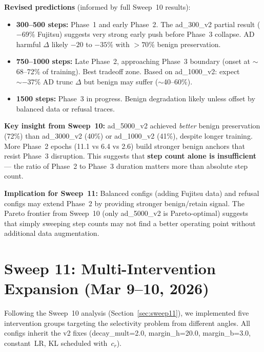 \documentclass[11pt]{article}
\begin{document}
\textbf{Revised predictions} (informed by full Sweep~10 results):
\begin{itemize}
  \item \textbf{300--500 steps:} Phase~1 and early Phase~2.
        The ad\_300\_v2 partial result ($-69\%$ Fujitsu) suggests very strong early
        push before Phase~3 collapse. AD harmful $\Delta$ likely $-20$ to $-35\%$
        with $>70\%$ benign preservation.
  \item \textbf{750--1000 steps:} Late Phase~2, approaching Phase~3 boundary
        (onset at $\sim$68--72\% of training). Best tradeoff zone.
        Based on ad\_1000\_v2: expect $\sim -37\%$ AD trunc $\Delta$ but benign
        may suffer ($\sim$40--60\%).
  \item \textbf{1500 steps:} Phase~3 in progress. Benign degradation likely
        unless offset by balanced data or refusal traces.
\end{itemize}

\textbf{Key insight from Sweep~10:} ad\_5000\_v2 achieved \emph{better} benign
preservation (72\%) than ad\_3000\_v2 (40\%) or ad\_1000\_v2 (41\%), despite
longer training. More Phase~2 epochs (11.1 vs 6.4 vs 2.6) build stronger
benign anchors that resist Phase~3 disruption. This suggests that
\textbf{step count alone is insufficient} --- the ratio of Phase~2 to Phase~3
duration matters more than absolute step count.

\textbf{Implication for Sweep~11:} Balanced configs (adding Fujitsu data) and
refusal configs may extend Phase~2 by providing stronger benign/retain signal.
The Pareto frontier from Sweep~10 (only ad\_5000\_v2 is Pareto-optimal) suggests
that simply sweeping step counts may not find a better operating point without
additional data augmentation.

\section{Sweep 11: Multi-Intervention Expansion (Mar 9--10, 2026)}
\label{sec:sweep11-full}

Following the Sweep~10 analysis (Section~\ref{sec:sweep11}), we implemented
five intervention groups targeting the selectivity problem from different
angles.  All configs inherit the v2 fixes (decay\_mult=2.0, margin\_h=20.0,
margin\_b=3.0, constant~LR, KL scheduled with~$c_r$).
\end{document}
